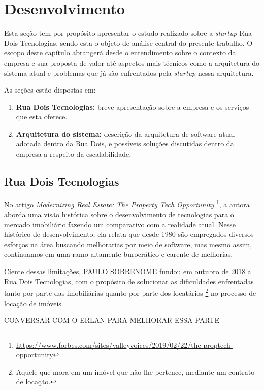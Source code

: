 \chapter{Desenvolvimento}

Esta seção tem por propósito apresentar o estudo realizado sobre a
\textit{startup} Rua Dois Tecnologias, sendo esta o objeto de análise
central do presente trabalho. O escopo deste capítulo abrangerá desde
o entendimento sobre o contexto da empresa e sua proposta de valor
até aspectos mais técnicos como a arquitetura do sistema atual e
problemas que já são enfrentados pela \textit{startup} nessa arquitetura.

  As seções estão dispostas em:

  \begin{enumerate}
    \item \textbf{Rua Dois Tecnologias:} breve apresentação sobre a empresa e os
      serviços que esta oferece.
    \item \textbf{Arquitetura do sistema:} descrição da arquitetura de software atual
      adotada dentro da Rua Dois, e possíveis soluções discutidas dentro da
      empresa a respeito da escalabilidade.
  \end{enumerate}

\section{Rua Dois Tecnologias}

No artigo \textit{Modernizing Real Estate: The Property Tech Opportunity}
\footnote{\url{https://www.forbes.com/sites/valleyvoices/2019/02/22/the-proptech-opportunity}},
a autora  aborda uma visão histórica sobre o desenvolvimento
de tecnologias para o mercado imobiliário fazendo um comparativo com a realidade atual.
Nesse histórico de desenvolvimento, ela relata que desde 1980 são empregados
diversos esforços na área buscando melhorarias por meio de software, mas mesmo
assim, continuamos em uma ramo altamente burocrático e carente de melhorias.

Ciente dessas limitações, PAULO SOBRENOME fundou em outubro de 2018 a
Rua Dois Tecnologias, com o propósito de solucionar as dificuldades
enfrentadas tanto por parte das imobiliárias quanto por parte dos locatários
\footnote{Aquele que mora em um imóvel que não lhe pertence, mediante um
contrato de locação.} no processo de locação de imóveis.

CONVERSAR COM O ERLAN PARA MELHORAR ESSA PARTE


